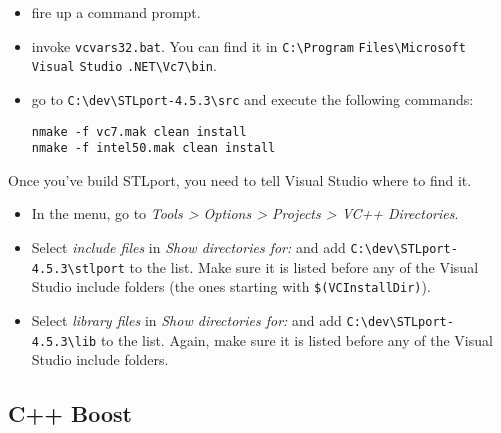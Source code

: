 \documentclass[10pt,a4paper,titlepage,dutch]{report}
\begin{document}
\begin{itemize}

\item fire up a command prompt.

\item invoke \verb|vcvars32.bat|.  You can find it in
\verb|C:\Program| \verb|Files\Microsoft| \verb|Visual|
\verb|Studio| \verb|.NET\Vc7\bin|.

\item go to \verb|C:\dev\STLport-4.5.3\src| and execute the
following commands:

\verb|nmake -f vc7.mak clean install|\\
\verb|nmake -f intel50.mak clean install|\\

\end{itemize}

Once you've build STLport, you need to tell Visual Studio where to
find it.

\begin{itemize}

\item In the menu, go to \emph{Tools > Options > Projects > VC++
Directories}.

\item Select \emph{include files} in \emph{Show directories for:}
and add \verb|C:\dev\STLport-4.5.3\stlport| to the list. Make sure
it is listed before any of the Visual Studio include folders (the
ones starting with \verb|$(VCInstallDir)|).

\item Select \emph{library files} in \emph{Show directories for:}
and add \verb|C:\dev\STLport-4.5.3\lib| to the list. Again, make
sure it is listed before any of the Visual Studio include folders.

\end{itemize}

\subsection{C++ Boost}
\end{document}

